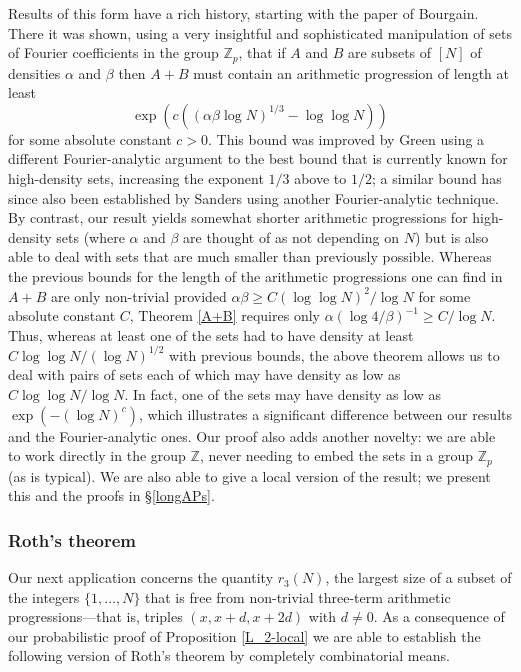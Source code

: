 \documentclass[12pt,a4paper,reqno]{amsart}
\numberwithin{equation}{section}
\theoremstyle{plain}
\theoremstyle{definition}
\renewcommand{\geq}{\geqslant}
\def\Z{\mathbb{Z}}
\newcommand{\Zmod}[1]{\Z_#1} %
\begin{document}
Results of this form have a rich history, starting with the paper \cite{bourgain:longAPs} of Bourgain. There it was shown, using a very insightful and sophisticated manipulation of sets of Fourier coefficients in the group $\Zmod{p}$, that if $A$ and $B$ are subsets of $[N]$ of densities $\alpha$ and $\beta$ then $A+B$ must contain an arithmetic progression of length at least
\begin{equation} \exp\left(c \left((\alpha \beta\log{N})^{1/3} - \log\log{N}\right)\right) \label{bourgain_bound} \end{equation}
for some absolute constant $c > 0$. This bound was improved by Green \cite{green:longAPs} using a different Fourier-analytic argument to the best bound that is currently known for high-density sets, increasing the exponent $1/3$ above to $1/2$; a similar bound has since also been established by Sanders \cite{sanders:longAPs} using another Fourier-analytic technique. By contrast, our result yields somewhat shorter arithmetic progressions for high-density sets (where $\alpha$ and $\beta$ are thought of as not depending on $N$) but is also able to deal with sets that are much smaller than previously possible. Whereas the previous bounds for the length of the arithmetic progressions one can find in $A+B$ are only non-trivial provided $\alpha \beta \geq C (\log \log N)^2/\log N$ for some absolute constant $C$, Theorem \ref{A+B} requires only $\alpha (\log{4/\beta})^{-1} \geq C/\log N$. Thus, whereas at least one of the sets had to have density at least $C \log \log N/(\log N)^{1/2}$ with previous bounds, the above theorem allows us to deal with pairs of sets each of which may have density as low as $C \log \log N/\log N$. In fact, one of the sets may have density as low as $\exp\left(-(\log N)^c \right)$, which illustrates a significant difference between our results and the Fourier-analytic ones. Our proof also adds another novelty: we are able to work directly in the group $\Z$, never needing to embed the sets in a group $\Zmod{p}$ (as is typical). We are also able to give a local version of the result; we present this and the proofs in \S\ref{longAPs}.

\subsubsection*{Roth's theorem}
Our next application concerns the quantity $r_3(N)$, the largest size of a subset of the integers $\{1,\ldots,N\}$ that is free from non-trivial three-term arithmetic progressions---that is, triples $(x,x+d,x+2d)$ with $d \neq 0$. As a consequence of our probabilistic proof of Proposition \ref{L_2-local} we are able to establish the following version of Roth's theorem \cite{roth} by completely combinatorial means.
\end{document}
